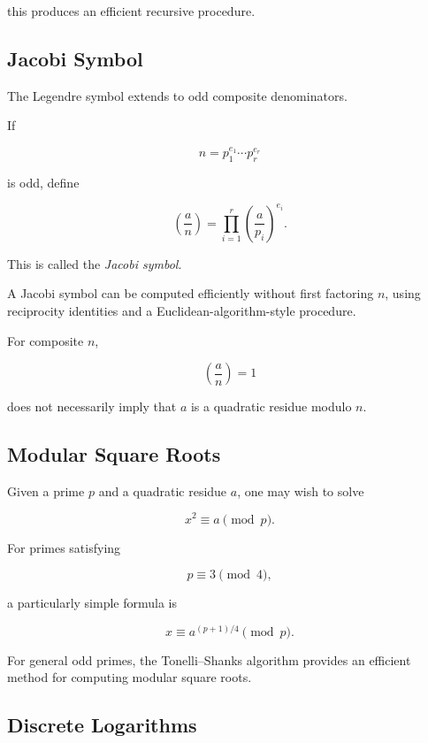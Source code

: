 this produces an efficient recursive procedure.

\subsection{Jacobi Symbol}
\label{subsec:jacobi-symbol-computation}

The Legendre symbol extends to odd composite denominators.

If

\[ n=p_1^{e_1}\cdots p_r^{e_r} \]

is odd, define

\[
\boxed{
\left(\frac an\right)
=
\prod_{i=1}^{r}
\left(\frac{a}{p_i}\right)^{e_i}.
}
\]

This is called the \emph{Jacobi symbol}.

A Jacobi symbol can be computed efficiently without first factoring \(n\),
using reciprocity identities and a Euclidean-algorithm-style procedure.

\begin{warningbox}
For composite \(n\),

\[ \left(\frac an\right)=1 \]

does not necessarily imply that \(a\) is a quadratic residue modulo \(n\).
\end{warningbox}

\subsection{Modular Square Roots}
\label{subsec:modular-square-roots}

Given a prime \(p\) and a quadratic residue \(a\), one may wish to solve

\[ x^2\equiv a\pmod p. \]

For primes satisfying

\[ p\equiv3\pmod4, \]

a particularly simple formula is

\[ \boxed{x\equiv a^{(p+1)/4}\pmod p.} \]

For general odd primes, the Tonelli--Shanks algorithm provides an efficient
method for computing modular square roots.

\subsection{Discrete Logarithms}
\label{subsec:computational-discrete-logarithms}

